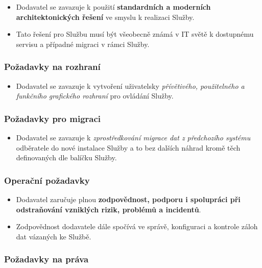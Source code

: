 \documentclass[11pt, a4paper, titlepage]{article}
\begin{document}
	\begin{itemize}
		\item Dodavatel se zavazuje k použití \textbf{standardních a moderních architektonických řešení} ve smyslu k realizaci Služby. 
		\item Tato řešení pro Službu musí být všeobecně známá v IT světě k dostupnému servisu a případné migraci v rámci Služby.
	\end{itemize}

	\subsubsection*{Požadavky na rozhraní}

	\begin{itemize}
		\item Dodavatel se zavazuje k vytvoření uživatelsky \emph{přívětivého, použitelného a funkčního grafického rozhraní} pro ovládání Služby.
	\end{itemize}

	\subsubsection*{Požadavky pro migraci}

	\begin{itemize}
		\item Dodavatel se zavazuje k \emph{zprostředkování migrace dat z předchozího systému} odběratele do nové instalace Služby a to bez dalších náhrad kromě těch definovaných dle balíčku Služby.
	\end{itemize}

	\subsubsection*{Operační požadavky}

	\begin{itemize}
		\item Dodavatel zaručuje plnou \textbf{zodpovědnost, podporu i spolupráci při odstraňování vzniklých rizik, problémů a incidentů}.
		\item Zodpovědnost dodavatele dále spočívá ve správě, konfiguraci a kontrole záloh dat vázaných ke Službě.
	\end{itemize}

	\subsubsection*{Požadavky na práva}
\end{document}

